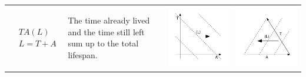 \documentclass[
  12pt
]{scrartcl}
\begin{document}
\begin{center}
\begin{longtable}{m{}m{}m{}m{}}
  \midrule
  $$\begin{aligned}
    &TA(L) \\
    &L = T + A
  \end{aligned}$$ &
  The time already lived and the time still left sum up to the total lifespan. &
  \includegraphics[width = \linewidth]{../fig/TAl.pdf} &
  \includegraphics[width = \linewidth]{../fig/TAl_iso.pdf}  \\

\end{longtable}
\end{center}
\end{document}
